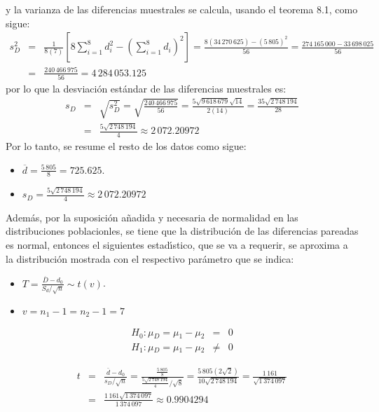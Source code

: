 \begin{solucion}
\begin{enumerate}
\begin{datos}
   y la varianza de las diferencias muestrales se calcula, usando el teorema 8.1,
   como sigue:
   \begin{eqnarray*}
    s_D^2 & = &
    \frac{1}{8(7)}
    \left[ 8\sum_{i=1}^{8} d_i^2 - \left( \sum_{i=1}^{8} d_i \right)^2 \right]
    = \frac{8(34\,270\,625) - (5\,805)^2}{56}
    = \frac{274\,165\,000 - 33\,698\,025}{56} \\
    & = & \frac{240\,466\,975}{56} = 4\,284\,053.125
   \end{eqnarray*}
   por lo que la desviaci\'on est\'andar de las diferencias muestrales es:
   \begin{eqnarray*}
    s_D & = & \sqrt{s_D^2} = \sqrt{\frac{240\,466\,975}{56}}
    = \frac{5\sqrt{9\,618\,679}\sqrt{14}}{2(14)}
    = \frac{35\sqrt{2\,748\,194}}{28} \\
    & = & \frac{5\sqrt{2\,748\,194}}{4}
    \approx 2\,072.20972
   \end{eqnarray*}
   Por lo tanto, se resume el resto de los datos como sigue:
   \begin{itemize}
    \item $\overline{d} = \frac{5\,805}{8} = 725.625$.
    \item $s_D = \frac{5\sqrt{2\,748\,194}}{4} \approx 2\,072.20972$
   \end{itemize}
   Adem\'as, por la suposici\'on a\~nadida y necesaria de normalidad
   en las distribuciones poblacionles, se tiene que la distribuci\'on
   de las diferencias pareadas es normal, entonces el siguientes estad\'{\i}stico,
   que se va a requerir, se aproxima a la distribuci\'on mostrada
   con el respectivo par\'ametro que se indica:
   \begin{itemize}
    \item $T = \frac{\overline{D} - d_0}{S_d/\sqrt{n}} \sim t(v)$.
    \item $v = n_1 - 1 = n_2 - 1 = 7$
   \end{itemize}
  \end{datos}

  \begin{hipotesis}
   \begin{eqnarray*}
    H_0: \mu{}_D = \mu{}_1 - \mu{}_2 &   =  & 0 \\
    H_1: \mu{}_D = \mu{}_1 - \mu{}_2 & \neq & 0
   \end{eqnarray*}
  \end{hipotesis}

  \begin{estadistico}
   \begin{eqnarray*}
    t & = & \frac{\bar{d} - d_0}{s_D/\sqrt{n}}
    = \frac{\frac{5\,805}{8}}{\frac{5\sqrt{2\,748\,194}}{4}/\sqrt{8}}
    = \frac{5\,805\left( 2\sqrt{2}\right)}{10\sqrt{2\,748\,194}}
    = \frac{1\,161}{\sqrt{1\,374\,097}} \\
    & = & \frac{1\,161\sqrt{1\,374\,097}}{1\,374\,097}
    \approx 0.9904294
   \end{eqnarray*}
  \end{estadistico}


\end{enumerate}
\end{solucion}
